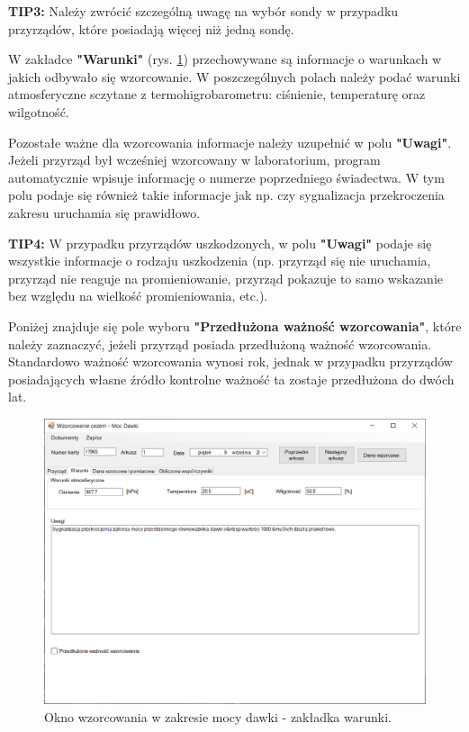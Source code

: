 \textbf{TIP3:} Należy zwrócić szczególną uwagę na wybór sondy w przypadku przyrządów, które posiadają więcej niż jedną sondę.

W zakładce \textbf{"Warunki"} (rys. \ref{mocWarunki}) przechowywane są informacje o warunkach w jakich odbywało się wzorcowanie. W poszczególnych polach należy podać warunki atmosferyczne sczytane z termohigrobarometru: ciśnienie, temperaturę oraz wilgotność.

Pozostałe ważne dla wzorcowania informacje należy uzupełnić w polu \textbf{"Uwagi"}. Jeżeli przyrząd był wcześniej wzorcowany w laboratorium, program automatycznie wpisuje informację o numerze poprzedniego świadectwa. W tym polu podaje się również takie informacje jak np. czy sygnalizacja przekroczenia zakresu uruchamia się prawidłowo. 

\textbf{TIP4:} W przypadku przyrządów uszkodzonych, w polu \textbf{"Uwagi"} podaje się wszystkie informacje o rodzaju uszkodzenia (np. przyrząd się nie uruchamia, przyrząd nie reaguje na promieniowanie, przyrząd pokazuje to samo wskazanie bez względu na wielkość promieniowania, etc.).

Poniżej znajduje się pole wyboru \textbf{"Przedłużona ważność wzorcowania"}, które należy zaznaczyć, jeżeli przyrząd posiada przedłużoną ważność wzorcowania. Standardowo ważność wzorcowania wynosi rok, jednak w przypadku przyrządów posiadających własne źródło kontrolne ważność ta zostaje przedłużona do dwóch lat.

\begin{figure}[htb]
	\centering
	\includegraphics[width=\columnwidth]{obrazki/Wzorcowanie/moc_dawki/warunki.png}
	\caption{Okno wzorcowania w zakresie mocy dawki - zakładka warunki.}
	\label{mocWarunki}
\end{figure}

